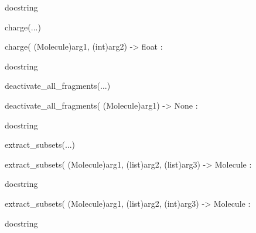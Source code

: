 \documentclass[letterpaper,10pt,english]{sphinxmanual}
\begin{document}
\begin{description}
\begin{description}
\begin{DUlineblock}{0em}
\begin{DUlineblock}{\DUlineblockindent}
\item[]
\begin{DUlineblock}{\DUlineblockindent}
\item[] docstring
\item[] 
\end{DUlineblock}
\end{DUlineblock}
\item[] charge(...)
\item[]
\begin{DUlineblock}{\DUlineblockindent}
\item[] charge( (Molecule)arg1, (int)arg2) -\textgreater{} float :
\item[]
\begin{DUlineblock}{\DUlineblockindent}
\item[] docstring
\item[] 
\end{DUlineblock}
\end{DUlineblock}
\item[] deactivate\_all\_fragments(...)
\item[]
\begin{DUlineblock}{\DUlineblockindent}
\item[] deactivate\_all\_fragments( (Molecule)arg1) -\textgreater{} None :
\item[]
\begin{DUlineblock}{\DUlineblockindent}
\item[] docstring
\item[] 
\end{DUlineblock}
\end{DUlineblock}
\item[] extract\_subsets(...)
\item[]
\begin{DUlineblock}{\DUlineblockindent}
\item[] extract\_subsets( (Molecule)arg1, (list)arg2, (list)arg3) -\textgreater{} Molecule :
\item[]
\begin{DUlineblock}{\DUlineblockindent}
\item[] docstring
\item[] 
\end{DUlineblock}
\item[] extract\_subsets( (Molecule)arg1, (list)arg2, (int)arg3) -\textgreater{} Molecule :
\item[]
\begin{DUlineblock}{\DUlineblockindent}
\item[] docstring

\end{DUlineblock}
\end{DUlineblock}
\end{DUlineblock}
\end{description}
\end{description}
\end{document}
